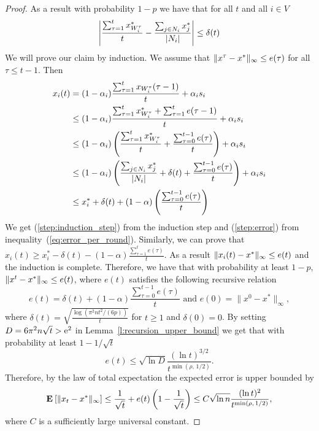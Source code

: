 \begin{proof}
  As a result with probability $1-p$ we have that for all $t$ and all $i \in V$
  \begin{equation}\label{eq:error_per_round}
    \left|
    \frac{\sum_{\tau=1}^t x^*_{W_i^\tau}}{t} -
    \frac{\sum_{j \in N_i} x^*_j}{|N_i|}
    \right| \leq \delta(t)
  \end{equation}
  We will prove our claim by induction.
  We assume that $\| x^{\tau}-x^* \|_{\infty} \leq e(\tau)$ for all
  $\tau \leq t-1$. Then
  \begin{align}
    x_i(t)
    &=
    (1-\alpha_i)\frac{\sum_{\tau=1}^{t}x_{W_i^{\tau}}(\tau-1)}{t}
    + \alpha_i s_i \nonumber \\
    &\leq
    (1-\alpha_i)\frac{\sum_{\tau=1}^{t}x^*_{W_i^{\tau}} +
      \sum_{\tau=1}^{t} e(\tau-1)}{t} + \alpha_i s_i \label{step:induction_step}\\
    &\leq
    (1-\alpha_i)
    \left(
    \frac{\sum_{\tau=1}^{t}x^*_{W_i^{\tau}}}{t}+
    \frac{\sum_{\tau=0}^{t-1} e(\tau)}{t}
    \right)
    + \alpha_i s_i \nonumber\\
    &\leq
    (1-\alpha_i)\left(\frac{\sum_{j \in N_i}x^*_{j}}{|N_i|} +
    \delta(t) + \frac{\sum_{\tau=0}^{t-1} e(\tau)}{t} \right) +
    \alpha_i s_i \label{step:error} \\
    &\leq
    x_i^* + \delta(t) + (1-\alpha)
    \left(
    \frac{\sum_{\tau=0}^{t-1} e(\tau)}{t}
    \right)
    \nonumber
  \end{align}
  We get (\ref{step:induction_step}) from the induction step and
  (\ref{step:error}) from inequality~(\ref{eq:error_per_round}).
  Similarly, we can prove that
  $x_i(t) \geq x_i^* - \delta(t) - (1-\alpha)
  \frac{\sum_{\tau=1}^t e(\tau)}{t}$.
  As a result $\| x_i(t)-x^* \|_{\infty} \leq e(t)$ and the induction
  is complete.  Therefore, we have that with probability at least $1-p$,
  \(\| x^t - x^* \|_{\infty} \leq e(t)\), where $e(t)$ satisfies the
  following recursive relation
  \[
    e(t) =
    \delta(t) + (1-\alpha)\frac{\sum_{\tau=0}^{t-1}e(\tau)}{t}
    \text{ and } e(0)=\|x^0 - x^*\|_{\infty},
  \]
  where $\delta(t) = \sqrt{ \frac{\log(\pi^2 n t^2/(6 p))}{t}}$ for $t\geq 1$
  and $\delta(0) = 0$.
  By setting $D = 6 \pi^2 n \sqrt{t} > \mathrm{e}^2$ in
  Lemma~\ref{l:recursion_upper_bound} we get that with probability at least
  $1-1/\sqrt{t}$
  \[
    e(t) \leq
    \sqrt{\ln D} \frac{(\ln t)^{3/2}}{t^{\min(\rho,\, 1/2)}}.
  \]
  Therefore, by the law of total expectation the expected error is upper
  bounded by
  \[
    \Exp{\norm{\infty}{x_t - x^*}} \leq \frac{1}{\sqrt{t}} + e(t) \lp( 1 -\frac{1}{\sqrt{t}} \rp)
    \leq C \sqrt{\ln n} \frac{(\ln t)^{2}}{t^{\min(\rho,\, 1/2)}},
  \]
  where $C$ is a sufficiently large universal constant.

\end{proof}
